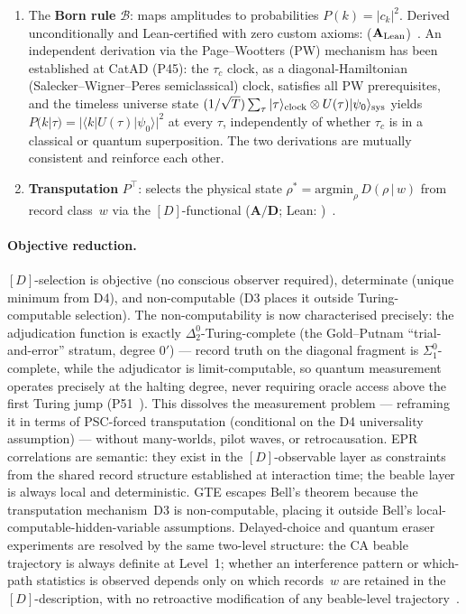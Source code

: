 \begin{enumerate}[leftmargin=2em,itemsep=0.15em]
  \item The \textbf{Born rule} $\mathcal{B}$: maps amplitudes to
    probabilities $P(k) = |c_k|^2$.  Derived unconditionally and Lean-certified
    with zero custom axioms: 
    ($\mathbf{A}_{\rm Lean}$)~\cite{SpivackPhiMDLField}.  An independent derivation
    via the Page--Wootters (PW) mechanism has been established at CatAD (P45): the
    $\tau_c$ clock, as a diagonal-Hamiltonian (Salecker--Wigner--Peres semiclassical)
    clock, satisfies all PW prerequisites, and the timeless universe state
    $(1/\sqrt{T})\sum_\tau|\tau\rangle_{\rm clock}\otimes U(\tau)|\psi_0\rangle_{\rm sys}$
    yields $P(k|\tau) = |\langle k|U(\tau)|\psi_0\rangle|^2$ at every $\tau$,
    independently of whether $\tau_c$ is in a classical or quantum superposition.
    The two derivations are mutually consistent and reinforce each other.
  \item \textbf{Transputation} $P^\top$: selects the physical state
    $\rho^* = \mathrm{argmin}_\rho\, D(\rho\,|\,w)$ from record class~$w$ via the
    $[D]$-functional ($\mathbf{A/D}$; Lean: )~\cite{SpivackSDS_PR0}.
\end{enumerate}

\paragraph{Objective reduction.}
$[D]$-selection is objective (no conscious observer required), determinate (unique
minimum from D4), and non-computable (D3 places it outside Turing-computable
selection).  The non-computability is now characterised precisely: the adjudication
function is exactly $\Delta_2^0$-Turing-complete (the Gold--Putnam
``trial-and-error'' stratum, degree $0'$) --- record truth on the diagonal fragment
is $\Sigma_1^0$-complete, while the adjudicator is limit-computable, so quantum
measurement operates precisely at the halting degree, never requiring oracle access
above the first Turing jump (P51~\cite{SpivackPolynomialTransputation}).
This dissolves the measurement problem --- reframing it in terms of PSC-forced transputation
(conditional on the D4 universality assumption) --- without many-worlds, pilot waves,
or retrocausation.  EPR correlations are semantic: they exist in the $[D]$-observable
layer as constraints from the shared record structure established at interaction time;
the beable layer is always local and deterministic.  GTE escapes Bell's theorem
because the transputation mechanism~D3 is non-computable, placing it outside Bell's
local-computable-hidden-variable assumptions.  Delayed-choice and quantum eraser
experiments are resolved by the same two-level structure: the CA beable trajectory is
always definite at Level~1; whether an interference pattern or which-path statistics
is observed depends only on which records~$w$ are retained in the $[D]$-description,
with no retroactive modification of any beable-level
trajectory~\cite{SpivackPhiMDLField}.

